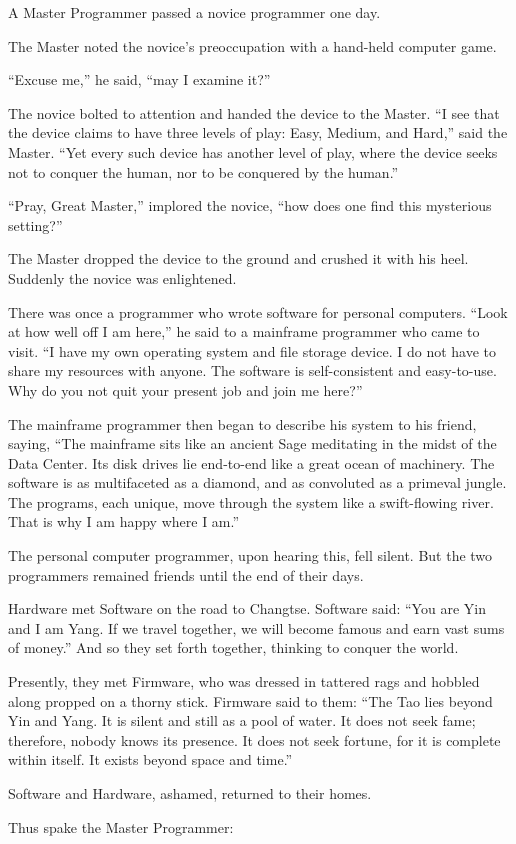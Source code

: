 A Master Programmer passed a novice programmer one day.

The Master noted the novice's preoccupation with a hand-held computer
game.

``Excuse me,'' he said, ``may I examine it?''

The novice bolted to attention and handed the device to the
Master. ``I see that the device claims to have three levels of play:
Easy, Medium, and Hard,'' said the Master. ``Yet every such device has
another level of play, where the device seeks not to conquer the
human, nor to be conquered by the human.''

``Pray, Great Master,'' implored the novice, ``how does one find this
mysterious setting?''

The Master dropped the device to the ground and crushed it with his
heel. Suddenly the novice was enlightened.

There was once a programmer who wrote software for personal
computers. ``Look at how well off I am here,'' he said to a mainframe
programmer who came to visit. ``I have my own operating system and
file storage device. I do not have to share my resources with
anyone. The software is self-consistent and easy-to-use. Why do you
not quit your present job and join me here?''

The mainframe programmer then began to describe his system to his
friend, saying, ``The mainframe sits like an ancient Sage meditating
in the midst of the Data Center. Its disk drives lie end-to-end like a
great ocean of machinery. The software is as multifaceted as a
diamond, and as convoluted as a primeval jungle. The programs, each
unique, move through the system like a swift-flowing river. That is
why I am happy where I am.''

The personal computer programmer, upon hearing this, fell silent. But
the two programmers remained friends until the end of their days.

Hardware met Software on the road to Changtse. Software said: ``You
are Yin and I am Yang. If we travel together, we will become famous
and earn vast sums of money.'' And so they set forth together,
thinking to conquer the world.

Presently, they met Firmware, who was dressed in tattered rags and
hobbled along propped on a thorny stick. Firmware said to them: ``The
Tao lies beyond Yin and Yang. It is silent and still as a pool of
water. It does not seek fame; therefore, nobody knows its presence. It
does not seek fortune, for it is complete within itself. It exists
beyond space and time.''

Software and Hardware, ashamed, returned to their homes.

Thus spake the Master Programmer:

\bye
